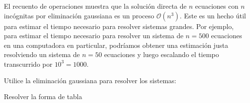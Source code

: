 El recuento de operaciones muestra que la solución directa de $n$
ecuaciones con $n$ incógnitas por eliminación gaussiana es un
proceso $\mathcal{O}\left(n^{3}\right)$.
Este es un hecho útil para estimar el tiempo necesario para resolver
sistemas grandes.
Por ejemplo, para estimar el tiempo necesario para resolver un
sistema de $n=500$ ecuaciones en una computadora en particular,
podríamos obtener una estimación justa resolviendo un sistema de
$n=50$ ecuaciones y luego escalando el tiempo transcurrido por
$10^{3}=1000$.

\begin{questions}
    \question

    Utilice la eliminación gaussiana para resolver los sistemas:

    \begin{multicols}{3}
    \end{multicols}

    \question

    Resolver la forma de tabla

    \begin{multicols}{2}
        \begin{parts}

\end{parts}
\end{multicols}
\end{questions}
